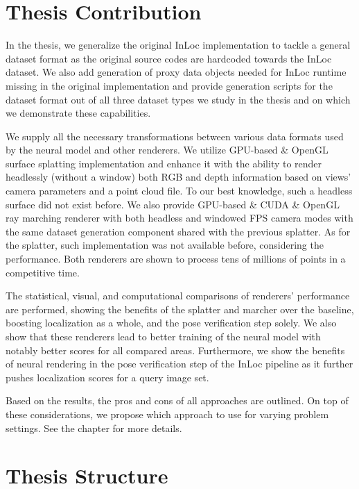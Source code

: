 \section*{Thesis Contribution}

In the thesis, we generalize the original InLoc implementation to tackle a general dataset
format as the original source codes are hardcoded towards the InLoc dataset. We also add
generation of proxy data objects needed for InLoc runtime missing in the original
implementation and provide generation scripts for the dataset format out of all
three dataset types we study in the thesis and on which we demonstrate these capabilities.

We supply all the necessary transformations between various data formats
used by the neural model and other renderers. We utilize GPU-based
\CC{} \& OpenGL surface splatting implementation and enhance it with the ability to render headlessly
(without a window) both RGB and depth information based on views' camera parameters and a point
cloud file. To our best knowledge, such a headless surface  did not exist before.
We also provide GPU-based \CC{} \& CUDA \& OpenGL ray marching renderer with both headless and windowed
FPS camera modes with the same dataset generation component shared with the previous
splatter. As for the splatter, such implementation was not available before, considering
the performance. Both \CC{} renderers are shown to process tens of millions
of points in a competitive time.

The statistical, visual, and computational comparisons of renderers' performance are performed,
showing the benefits of the splatter and marcher over the baseline, boosting localization
as a whole, and the pose verification step solely. We also show that these renderers
lead to better training of the neural model with notably better scores for all compared
areas. Furthermore, we show the benefits of neural rendering in the pose verification step
of the InLoc pipeline as it further pushes localization scores for a query image set.

Based on the results, the pros and cons of all approaches are outlined. On top of these
considerations, we propose which approach to use for varying problem settings. See the
 chapter for more details.

\section*{Thesis Structure}

